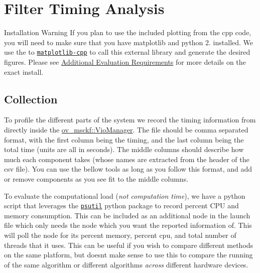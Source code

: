  \hypertarget{eval-timing}{}\section{Filter Timing Analysis}\label{eval-timing}


\begin{DoxyParagraph}{Installation Warning}
If you plan to use the included plotting from the cpp code, you will need to make sure that you have matplotlib and python 2. installed. We use the to \href{https://github.com/lava/matplotlib-cpp}{\tt matplotlib-\/cpp} to call this external library and generate the desired figures. Please see \hyperlink{gs-installing_gs-install-oveval}{Additional Evaluation Requirements} for more details on the exact install.
\end{DoxyParagraph}
\hypertarget{eval-timing_eval-ov-timing-collection}{}\subsection{Collection}\label{eval-timing_eval-ov-timing-collection}
To profile the different parts of the system we record the timing information from directly inside the \hyperlink{classov__msckf_1_1VioManager}{ov\+\_\+msckf\+::\+Vio\+Manager}. The file should be comma separated format, with the first column being the timing, and the last column being the total time (units are all in seconds). The middle columns should describe how much each component takes (whose names are extracted from the header of the csv file). You can use the bellow tools as long as you follow this format, and add or remove components as you see fit to the middle columns.

To evaluate the computational load ({\itshape not computation time}), we have a python script that leverages the \href{https://github.com/giampaolo/psutil}{\tt psutil} python package to record percent C\+PU and memory consumption. This can be included as an additional node in the launch file which only needs the node which you want the reported information of. This will poll the node for its percent memory, percent cpu, and total number of threads that it uses. This can be useful if you wish to compare different methods on the same platform, but doesn\textquotesingle{}t make sense to use this to compare the running of the same algorithm or different algorithms {\itshape across} different hardware devices.


